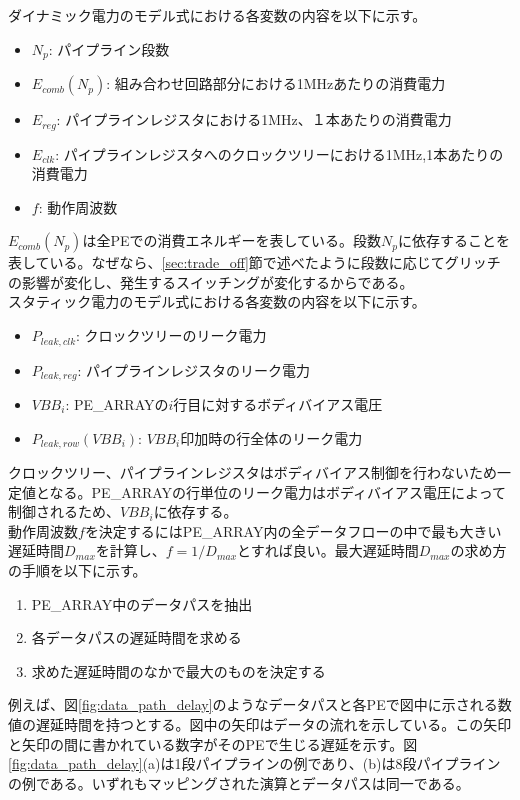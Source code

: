 {ダイナミック電力のモデル式における各変数の内容を以下に示す。
\begin{itemize}
\item $N_p$: パイプライン段数
\item $E_{comb}(N_p)$: 組み合わせ回路部分における1MHzあたりの消費電力
\item $E_{reg}$: パイプラインレジスタにおける1MHz、１本あたりの消費電力
\item $E_{clk}$: パイプラインレジスタへのクロックツリーにおける1MHz,1本あたりの消費電力
\item $f$: 動作周波数
\end{itemize}

$E_{comb}(N_p)$は全PEでの消費エネルギーを表している。段数$N_p$に依存することを表している。なぜなら、\ref{sec:trade_off}節で述べたように段数に応じてグリッチの影響が変化し、発生するスイッチングが変化するからである。\\

スタティック電力のモデル式における各変数の内容を以下に示す。
\begin{itemize}
\item $P_{leak,clk}$: クロックツリーのリーク電力
\item $P_{leak,reg}$: パイプラインレジスタのリーク電力
\item $VBB_i$: PE\_ARRAYの$i$行目に対するボディバイアス電圧
\item $P_{leak,row}(VBB_i)$: $VBB_i$印加時の行全体のリーク電力
\end{itemize}

クロックツリー、パイプラインレジスタはボディバイアス制御を行わないため一定値となる。PE\_ARRAYの行単位のリーク電力はボディバイアス電圧によって制御されるため、$VBB_i$に依存する。\\

動作周波数$f$を決定するにはPE\_ARRAY内の全データフローの中で最も大きい遅延時間$D_{max}$を計算し、$f = 1/D_{max}$とすれば良い。最大遅延時間$D_{max}$の求め方の手順を以下に示す。

\begin{enumerate}
\item PE\_ARRAY中のデータパスを抽出
\item 各データパスの遅延時間を求める
\item 求めた遅延時間のなかで最大のものを決定する
\end{enumerate}

例えば、図\ref{fig:data_path_delay}のようなデータパスと各PEで図中に示される数値の遅延時間を持つとする。図中の矢印はデータの流れを示している。この矢印と矢印の間に書かれている数字がそのPEで生じる遅延を示す。図\ref{fig:data_path_delay}(a)は1段パイプラインの例であり、(b)は8段パイプラインの例である。いずれもマッピングされた演算とデータパスは同一である。

}

